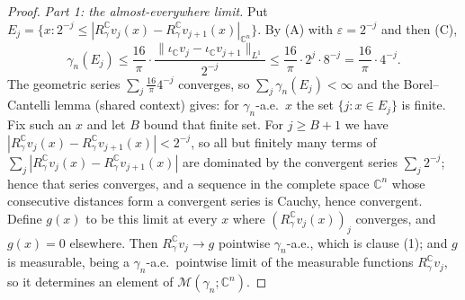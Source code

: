 \begin{proof}
\emph{Part 1: the almost-everywhere limit.}
Put $E_j = \{x : 2^{-j} \leq |R_\gamma^{\mathbb{C}} v_j(x)
 - R_\gamma^{\mathbb{C}} v_{j+1}(x)|_{\mathbb{C}^n}\}$.  By (A) with
$\varepsilon = 2^{-j}$ and then (C),
\[
  \gamma_n(E_j) \leq \frac{16}{\pi}\cdot
    \frac{\|\iota_{\mathbb{C}} v_j - \iota_{\mathbb{C}} v_{j+1}\|_{L^1}}{2^{-j}}
    \leq \frac{16}{\pi}\cdot 2^{j}\cdot 8^{-j}
    = \frac{16}{\pi}\cdot 4^{-j} .
\]
The geometric series $\sum_j \tfrac{16}{\pi}4^{-j}$ converges, so
$\sum_j \gamma_n(E_j) < \infty$ and the Borel--Cantelli lemma (shared context)
gives: for $\gamma_n$-a.e.\ $x$ the set $\{j : x \in E_j\}$ is finite.  Fix such
an $x$ and let $B$ bound that finite set.  For $j \geq B+1$ we have
$|R_\gamma^{\mathbb{C}} v_j(x) - R_\gamma^{\mathbb{C}} v_{j+1}(x)| < 2^{-j}$, so
all but finitely many terms of
$\sum_j |R_\gamma^{\mathbb{C}} v_j(x) - R_\gamma^{\mathbb{C}} v_{j+1}(x)|$ are
dominated by the convergent series $\sum_j 2^{-j}$; hence that series converges,
and a sequence in the complete space $\mathbb{C}^n$ whose consecutive distances
form a convergent series is Cauchy, hence convergent.  Define $g(x)$ to be this
limit at every $x$ where $(R_\gamma^{\mathbb{C}} v_j(x))_j$ converges, and
$g(x) = 0$ elsewhere.  Then $R_\gamma^{\mathbb{C}} v_j \to g$ pointwise
$\gamma_n$-a.e., which is clause (1); and $g$ is measurable, being a
$\gamma_n$-a.e.\ pointwise limit of the measurable functions
$R_\gamma^{\mathbb{C}} v_j$, so it determines an element of
$\mathcal{M}(\gamma_n;\mathbb{C}^n)$.


\end{proof}

